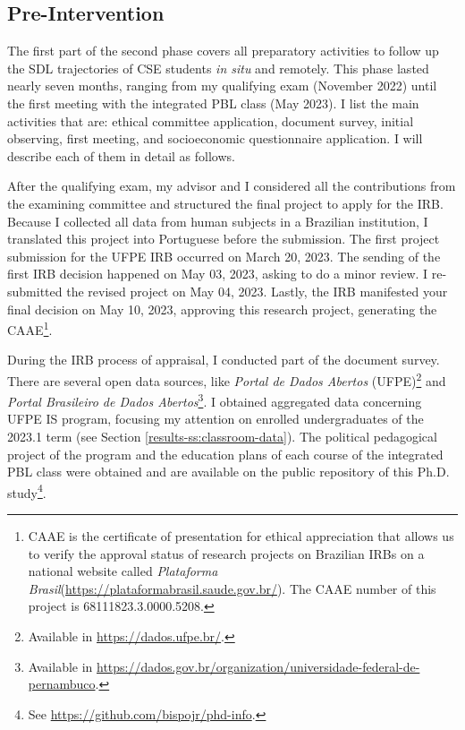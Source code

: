 \subsection{Pre-Intervention}
\label{phd-route-ss:pre-int}

The first part of the second phase covers all preparatory activities to follow up the \gls{SDL} trajectories of CSE students \textit{in situ} and remotely. This phase lasted nearly seven months, ranging from my qualifying exam (November 2022) until the first meeting with the integrated \gls{PBL} class (May 2023). I list the main activities that are: ethical committee application, document survey, initial observing, first meeting, and socioeconomic questionnaire application.  I will describe each of them in detail as follows.

After the qualifying exam, my advisor and I considered all the contributions from the examining committee and structured the final project to apply for the \gls{IRB}. Because I collected all data from human subjects in a Brazilian institution, I translated this project into Portuguese before the submission. The first project submission for the \gls{UFPE} \gls{IRB} occurred on March 20, 2023. The sending of the first \gls{IRB} decision happened on May 03, 2023, asking to do a minor review. I re-submitted the revised project on May 04, 2023. Lastly, the \gls{IRB} manifested your final decision on May 10, 2023, approving this research project, generating the  \gls{CAAE}\footnote{CAAE is the certificate of presentation for ethical appreciation that allows us to verify the approval status of research projects on Brazilian \gls{IRB}s on a national website called \textit{Plataforma Brasil}(\url{https://plataformabrasil.saude.gov.br/}). The \gls{CAAE} number of this project is 68111823.3.0000.5208.}.

During the \gls{IRB} process of appraisal, I conducted part of the document survey. There are several open data sources, like \textit{Portal de Dados Abertos} (\gls{UFPE})\footnote{Available in \url{https://dados.ufpe.br/}.} and \textit{Portal Brasileiro de Dados Abertos}\footnote{Available in \url{https://dados.gov.br/organization/universidade-federal-de-pernambuco}.}. I obtained aggregated data concerning \gls{UFPE} \gls{IS} program, focusing my attention on enrolled undergraduates of the 2023.1 term (see Section \ref{results-ss:classroom-data}). The political pedagogical project of the program and the education plans of each course of the integrated \gls{PBL} class were obtained and are available on the public repository of this \gls{Ph.D.} study\footnote{See \url{https://github.com/bispojr/phd-info}.}. 

